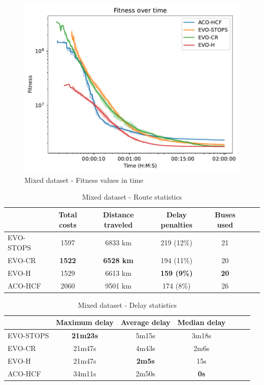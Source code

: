 \begin{figure}
    \centering
    \includegraphics[width=1\linewidth]
    {img/exp_mixed_100_time.pdf}
    \caption{Mixed dataset - Fitness values in time}
    \label{fig:exp_mixed}
\end{figure}

\begin{table}
    \centering
    \begin{tabular}{lcccccc}
         & Total costs & Distance traveled & Delay penalties & Buses used \\
         \hline
         EVO-STOPS & 1597 & 6833 km & 219 (12\%) & 21 \\
         EVO-CR & \textbf{1522} & \textbf{6528 km} & 194 (11\%) & 20 \\
         EVO-H & 1529 & 6613 km & \textbf{159 (9\%)} & \textbf{20} \\
         ACO-HCF & 2060 & 9501 km & 174 (8\%) & 26 \\
    \end{tabular}
    \caption{Mixed dataset - Route statistics}
    \label{tab:exp_mixed_route_stats}
\end{table}

\begin{table}
    \centering
    \begin{tabular}{lcccccc}
         &  Maximum delay & Average delay & Median delay \\
         \hline
         EVO-STOPS & \textbf{21m23s} & 5m15s & 3m18s \\
         EVO-CR & 21m47s & 4m43s & 2m6s \\
         EVO-H & 21m47s & \textbf{2m5s} & 15s \\
         ACO-HCF & 34m11s & 2m50s & \textbf{0s} \\
    \end{tabular}
    \caption{Mixed dataset - Delay statistics}
    \label{tab:exp_mixed_delay_stats}
\end{table}

\clearpage